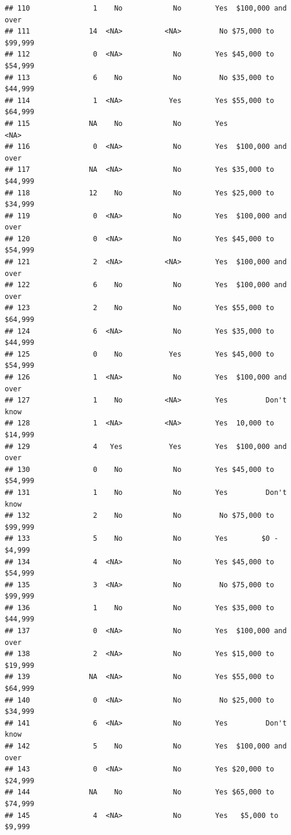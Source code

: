 \documentclass[man]{apa6}
\begin{document}
\begin{verbatim}
## 110               1    No            No        Yes  $100,000 and over
## 111              14  <NA>          <NA>         No $75,000 to $99,999
## 112               0  <NA>            No        Yes $45,000 to $54,999
## 113               6    No            No         No $35,000 to $44,999
## 114               1  <NA>           Yes        Yes $55,000 to $64,999
## 115              NA    No            No        Yes               <NA>
## 116               0  <NA>            No        Yes  $100,000 and over
## 117              NA  <NA>            No        Yes $35,000 to $44,999
## 118              12    No            No        Yes $25,000 to $34,999
## 119               0  <NA>            No        Yes  $100,000 and over
## 120               0  <NA>            No        Yes $45,000 to $54,999
## 121               2  <NA>          <NA>        Yes  $100,000 and over
## 122               6    No            No        Yes  $100,000 and over
## 123               2    No            No        Yes $55,000 to $64,999
## 124               6  <NA>            No        Yes $35,000 to $44,999
## 125               0    No           Yes        Yes $45,000 to $54,999
## 126               1  <NA>            No        Yes  $100,000 and over
## 127               1    No          <NA>        Yes         Don't know
## 128               1  <NA>          <NA>        Yes  10,000 to $14,999
## 129               4   Yes           Yes        Yes  $100,000 and over
## 130               0    No            No        Yes $45,000 to $54,999
## 131               1    No            No        Yes         Don't know
## 132               2    No            No         No $75,000 to $99,999
## 133               5    No            No        Yes        $0 - $4,999
## 134               4  <NA>            No        Yes $45,000 to $54,999
## 135               3  <NA>            No         No $75,000 to $99,999
## 136               1    No            No        Yes $35,000 to $44,999
## 137               0  <NA>            No        Yes  $100,000 and over
## 138               2  <NA>            No        Yes $15,000 to $19,999
## 139              NA  <NA>            No        Yes $55,000 to $64,999
## 140               0  <NA>            No         No $25,000 to $34,999
## 141               6  <NA>            No        Yes         Don't know
## 142               5    No            No        Yes  $100,000 and over
## 143               0  <NA>            No        Yes $20,000 to $24,999
## 144              NA    No            No        Yes $65,000 to $74,999
## 145               4  <NA>            No        Yes   $5,000 to $9,999

\end{verbatim}
\end{document}
